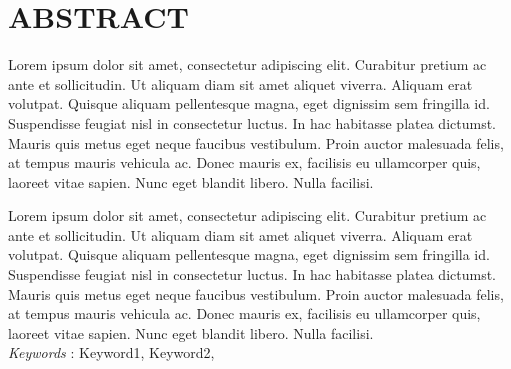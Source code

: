 \clearpage
{}
{}
\chapter*{ABSTRACT}
Lorem ipsum dolor sit amet, consectetur adipiscing elit. Curabitur pretium ac ante et sollicitudin. Ut aliquam diam sit amet aliquet viverra. Aliquam erat volutpat. Quisque aliquam pellentesque magna, eget dignissim sem fringilla id. Suspendisse feugiat nisl in consectetur luctus. In hac habitasse platea dictumst. Mauris quis metus eget neque faucibus vestibulum. Proin auctor malesuada felis, at tempus mauris vehicula ac. Donec mauris ex, facilisis eu ullamcorper quis, laoreet vitae sapien. Nunc eget blandit libero. Nulla facilisi.

Lorem ipsum dolor sit amet, consectetur adipiscing elit. Curabitur pretium ac ante et sollicitudin. Ut aliquam diam sit amet aliquet viverra. Aliquam erat volutpat. Quisque aliquam pellentesque magna, eget dignissim sem fringilla id. Suspendisse feugiat nisl in consectetur luctus. In hac habitasse platea dictumst. Mauris quis metus eget neque faucibus vestibulum. Proin auctor malesuada felis, at tempus mauris vehicula ac. Donec mauris ex, facilisis eu ullamcorper quis, laoreet vitae sapien. Nunc eget blandit libero. Nulla facilisi.
\\

\textit{Keywords} : Keyword1, Keyword2, 